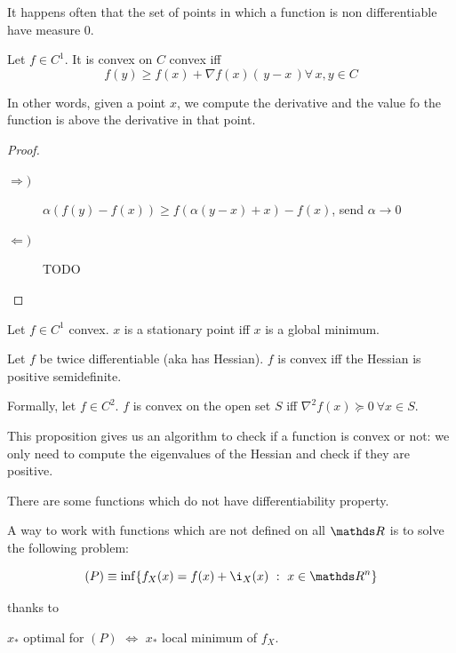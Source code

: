 \documentclass[computationalMathematics.tex]{subfiles}
\begin{document}
It happens often that the set of points in which a function is non differentiable have measure $0$.

\begin{theorem}
Let $f \in C^1$. It is convex on $C$ convex iff
\[
  f(y) \geq f(x) + \nabla f(x) ( \, y - x \, ) \forall \, x,y \in C
\]

In other words, given a point $x$, we compute the derivative and the value fo the function is above the derivative in that point.
\end{theorem}

\begin{proof}
  \begin{description}
    \item[$\Rightarrow)$]
      $\alpha (f(y) - f(x)) \geq f( \alpha (y - x) + x) - f(x)$, send $\alpha \to 0$
    \item[$\Leftarrow)$]TODO
  \end{description}
\end{proof}

\begin{theorem}
Let $f \in C^1$ convex. $x$ is a stationary point iff $x$ is a global minimum.
\end{theorem}

\begin{proposition}
  Let $f$ be twice differentiable (aka has Hessian). $f$ is convex iff the Hessian is positive semidefinite.

  Formally, let $f \in C^2$. $f$ is convex on the open set $S$ iff $\nabla^2 f(x) \succeq 0~\forall x \in S$.
\end{proposition}

This proposition gives us an algorithm to check if a function is convex or not: we only need to compute the eigenvalues of the Hessian and check if they are positive.

There are some functions which do not have differentiability property.

A way to work with functions which are not defined on all $\R$ is to solve the following problem:

\[
  (P) \equiv \inf \{f_X(x) = f(x) + \i_X(x)~:~x \in \R^n\}
\]

thanks to

\begin{theorem}
$x_*$ optimal for $(P)$ $\iff$ $x_*$ local minimum of $f_X$.
\end{theorem}
\end{document}
